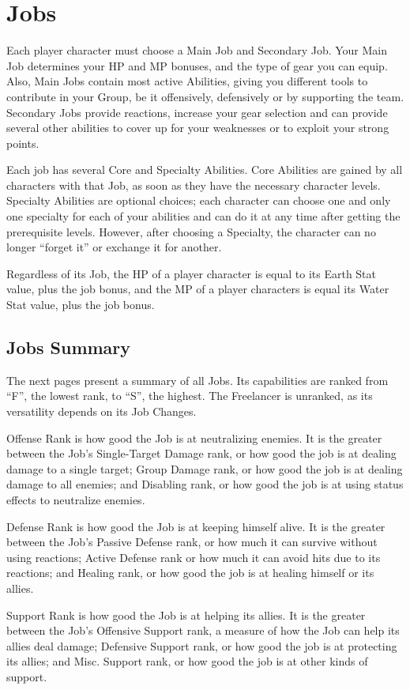 \section{Jobs}
\label{sec:jobs}
\begin{multicols}{2}
Each player character must choose a Main
Job and Secondary Job. Your Main Job determines
your HP and MP bonuses, and the type of gear you
can equip. Also, Main Jobs contain most active
Abilities, giving you different tools to contribute in
your Group, be it offensively, defensively or by
supporting the team. Secondary Jobs provide
reactions, increase your gear selection and can
provide several other abilities to cover up for your
weaknesses or to exploit your strong points.

Each job has several Core and Specialty
Abilities. Core Abilities are gained by all characters
with that Job, as soon as they have the necessary
character levels. Specialty Abilities are optional
choices; each character can choose one and only
one specialty for each of your abilities and can do
it at any time after getting the prerequisite levels.
However, after choosing a Specialty, the character
can no longer ``forget it'' or exchange it for another.

Regardless of its Job, the HP of a player character is equal to its Earth Stat value, plus the job bonus, and the MP of a player characters is equal its Water Stat value, plus the job bonus.

\subsection{Jobs Summary}
\label{subsec:jobsumm}
The next pages present a summary of all Jobs. Its capabilities are ranked from ``F'', the lowest rank, to ``S'', the highest. The Freelancer is unranked, as its versatility depends on its Job Changes.

Offense Rank is how good the Job is at neutralizing enemies. It is the greater between the Job's Single-Target Damage rank, or how good the job is at dealing damage to a single target; Group Damage rank, or how good the job is at dealing damage to all enemies; and Disabling rank, or how good the job is at using status effects to neutralize enemies.

Defense Rank is how good the Job is at
keeping himself alive. It is the greater between the
Job's Passive Defense rank, or how much it can
survive without using reactions; Active Defense
rank or how much it can avoid hits due to its
reactions; and Healing rank, or how good the job is
at healing himself or its allies.

Support Rank is how good the Job is at
helping its allies. It is the greater between the Job's
Offensive Support rank, a measure of how the Job
can help its allies deal damage; Defensive Support
rank, or how good the job is at protecting its allies;
and Misc. Support rank, or how good the job is at
other kinds of support.
\end{multicols}

